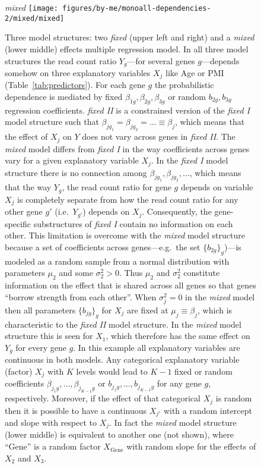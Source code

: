 \documentclass[letterpaper]{article}
\begin{document}
\begin{figure}[H]
\begin{center}
\emph{mixed}
\texttt{[image: figures/by-me/monoall-dependencies-2/mixed/mixed]}
\end{center}
\caption{ Three model structures: two \emph{fixed} (upper left and right) and
a \emph{mixed} (lower middle) effects multiple regression model.  In all three
model structures the read count ratio \(Y_g\)---for several genes
\(g\)---depends somehow on three explanatory variables \(X_j\) like Age or PMI
(Table~\ref{tab:predictors}).  For each gene \(g\) the probabilistic
dependence is mediated by fixed \(\beta_{1g},\beta_{2g},\beta_{3g}\) or random
\(b_{2g},b_{3g}\) regression coefficients.  \emph{fixed II} is a constrained
version of the \emph{fixed I} model structure such that
\(\beta_{jg_1}=\beta_{jg_2}=...\equiv \beta_j\), which means that the effect
of \(X_j\) on \(Y\) does not vary across genes in \emph{fixed II}.  The
\emph{mixed} model differs from \emph{fixed I}  in the way coefficients across
genes vary for a given explanatory variable \(X_j\).  In the \emph{fixed I}
model structure there is no connection among
\(\beta_{jg_1},\beta_{jg_2},...\), which means that the way \(Y_{g}\), the
read count ratio for gene \(g\) depends on variable \(X_j\) is completely
separate from how the read count ratio for any other gene \(g'\)
(i.e.~\(Y_{g'}\)) depends on \(X_j\).  Consequently, the gene-specific
substructures of \emph{fixed I} contain no information on each other.  This
limitation is overcome with the \emph{mixed} model structure because a set of
coefficients across genes---e.g.~the set \(\{b_{2g}\}_g\))---is modeled as a
random sample from a normal distribution with parameters \(\mu_2\) and some
\(\sigma^2_2>0\).  Thus \(\mu_2\) and \(\sigma^2_2\) constitute information on
the effect that is shared across all genes so that genes ``borrow strength
from each other''.  When \(\sigma^2_j=0\) in the \emph{mixed} model then all parameters \(\{b_{jg}\}_g\) for
\(X_j\) are fixed at \(\mu_j\equiv\beta_j\), which is characteristic to the
\emph{fixed II} model structure.  In the \emph{mixed} model structure this is
seen for \(X_1\), which therefore has the same effect on \(Y_g\) for every
gene \(g\).  In this example all explanatory variables are continuous in both
models.  Any categorical explanatory variable (factor) \(X_j\) with \(K\)
levels would lead to \(K - 1\) fixed or random coefficients
\(\beta_{j_1g},...,\beta_{j_{K-1}g}\) or \(b_{j_1g},...,b_{j_{K-1}g}\) for any
gene \(g\), respectively.  Moreover, if the effect of that categorical \(X_j\)
is random then it is possible to have a continuous \(X_{j'}\) with a random
intercept and slope with respect to \(X_j\).  In fact the \emph{mixed} model structure
(lower middle) is equivalent to another one (not shown), where ``Gene'' is a
random factor \(X_\mathrm{Gene}\) with random slope for the effects of \(X_2\)
and \(X_3\).  }
\label{fig:glm-vs-hierarch}
\end{figure}
\end{document}
